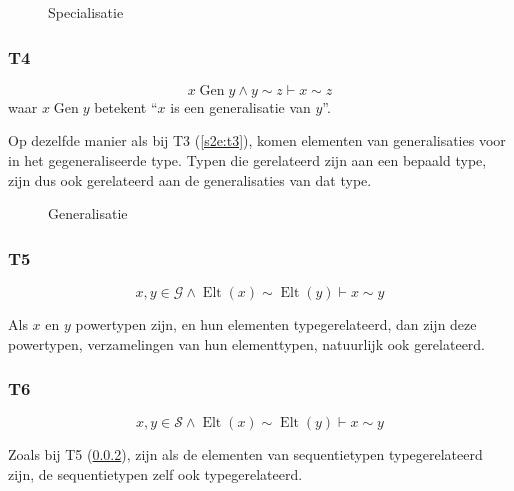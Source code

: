 \documentclass{article}
\begin{document}
\begin{figure}
  \centering
  \caption{Specialisatie}
  \label{fig:specialisatie}
\end{figure}


\subsubsection{T4}
\[
  x \operatorname{Gen} y \wedge y \sim z \vdash x \sim z
\] waar $x \operatorname{Gen} y$ betekent ``$x$ is een generalisatie van $y$''.

Op dezelfde manier als bij T3 (\ref{s2e:t3}), komen elementen van
generalisaties voor in het gegeneraliseerde type. Typen die gerelateerd zijn aan 
een bepaald type, zijn dus ook gerelateerd aan de generalisaties
van dat type.


\begin{figure}[b]
  \centering
  \caption{Generalisatie}
  \label{fig:generalisatie}
\end{figure}

\subsubsection{T5}
\label{T5}
\[
  x,y \in \mathcal{G} \wedge \operatorname{Elt}(x) \sim 
  \operatorname{Elt}(y) \vdash x \sim y
\]

Als $x$ en $y$ powertypen zijn, en hun elementen typegerelateerd, 
dan zijn deze powertypen, verzamelingen van hun elementtypen,
natuurlijk ook gerelateerd.

\subsubsection{T6}
\[
  x,y \in \mathcal{S} \wedge \operatorname{Elt}(x) \sim 
  \operatorname{Elt}(y) \vdash x \sim y
\]

Zoals bij T5 (\ref{T5}), zijn als de elementen van sequentietypen 
typegerelateerd zijn, de sequentietypen zelf ook typegerelateerd.
\end{document}
